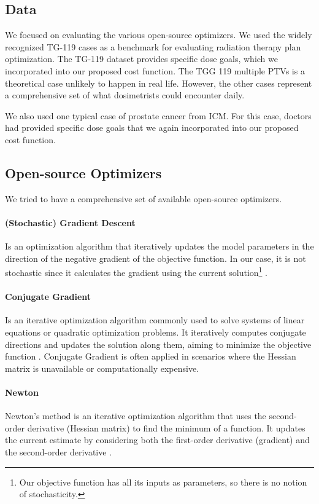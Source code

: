 \subsection{Data}
We focused on evaluating the various open-source optimizers.
We used the widely recognized TG-119 \cite{AAPM-TG119} cases as a benchmark for evaluating radiation therapy plan optimization.
The TG-119 dataset provides specific dose goals, which we incorporated into our proposed cost function.
The TGG 119 multiple PTVs is a theoretical case unlikely to happen in real life.
However, the other cases represent a comprehensive set of what dosimetrists could encounter daily.

We also used one typical case of prostate cancer from ICM.
For this case, doctors had provided specific dose goals that we again incorporated into our proposed cost function.

\subsection{Open-source Optimizers}
We tried to have a comprehensive set of available open-source optimizers.
\paragraph{(Stochastic) Gradient Descent}
Is an optimization algorithm that iteratively updates the model parameters in the direction of the negative gradient of the objective function.
In our case, it is not stochastic since it calculates the gradient using the current solution\footnote{Our objective function has all its inputs as parameters, so there is no notion of stochasticity.} \cite{Lemarechal2012}.
\paragraph{Conjugate Gradient}
Is an iterative optimization algorithm commonly used to solve systems of linear equations or quadratic optimization problems.
It iteratively computes conjugate directions and updates the solution along them, aiming to minimize the objective function \cite{Hestenes1952}.
Conjugate Gradient is often applied in scenarios where the Hessian matrix is unavailable or computationally expensive.
\paragraph{Newton}
Newton's method is an iterative optimization algorithm that uses the second-order derivative (Hessian matrix) to find the minimum of a function.
It updates the current estimate by considering both the first-order derivative (gradient) and the second-order derivative \cite{Nocedal06}.
